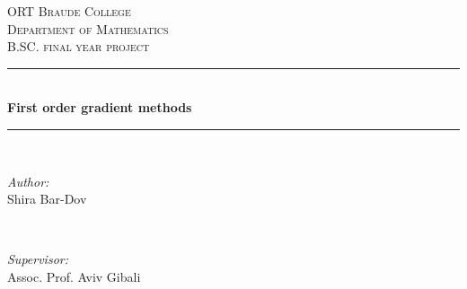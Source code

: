 \documentclass[12pt]{article}
\begin{document}

\begin{titlepage}

\newcommand{\HRule}{\rule{\linewidth}{0.5mm}} %

\center %


\textsc{\LARGE ORT Braude College}\\[1.5cm] %
\textsc{\LARGE Department of Mathematics}\\[0.5cm] %
\textsc{\LARGE B.SC. final year project}\\[0.5cm] %
\HRule \\[0.4cm]
{ \huge \bfseries First order gradient methods}\\[0.4cm] %
\HRule \\[1.5cm]
\begin{minipage}{0.4\textwidth}
\begin{flushleft} \large
\emph{Author:}\\
Shira Bar-Dov %
\end{flushleft}
\end{minipage}
~
\begin{minipage}{0.4\textwidth}
\begin{flushright} \large
\emph{Supervisor:} \\
Assoc. Prof. Aviv Gibali  %
\end{flushright}
\end{minipage}\\[2cm]


\end{titlepage}
\end{document}
